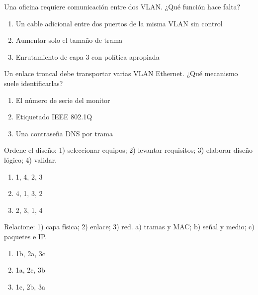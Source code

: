 \noindent\begin{minipage}{\linewidth}\setlength{\parskip}{4pt}\label{q:R-017}
Una oficina requiere comunicación entre dos VLAN. ¿Qué función hace falta?
\begin{enumerate}[label=\Alph*),nosep]
\item Un cable adicional entre dos puertos de la misma VLAN sin control
\item Aumentar solo el tamaño de trama
\item Enrutamiento de capa 3 con política apropiada
\end{enumerate}\end{minipage}\par\medskip

\noindent\begin{minipage}{\linewidth}\setlength{\parskip}{4pt}\label{q:R-018}
Un enlace troncal debe transportar varias VLAN Ethernet. ¿Qué mecanismo suele identificarlas?
\begin{enumerate}[label=\Alph*),nosep]
\item El número de serie del monitor
\item Etiquetado IEEE 802.1Q
\item Una contraseña DNS por trama
\end{enumerate}\end{minipage}\par\medskip

\noindent\begin{minipage}{\linewidth}\setlength{\parskip}{4pt}\label{q:R-019}
Ordene el diseño: 1) seleccionar equipos; 2) levantar requisitos; 3) elaborar diseño lógico; 4) validar.
\begin{enumerate}[label=\Alph*),nosep]
\item 1, 4, 2, 3
\item 4, 1, 3, 2
\item 2, 3, 1, 4
\end{enumerate}\end{minipage}\par\medskip

\noindent\begin{minipage}{\linewidth}\setlength{\parskip}{4pt}\label{q:R-020}
Relacione: 1) capa física; 2) enlace; 3) red. a) tramas y MAC; b) señal y medio; c) paquetes e IP.
\begin{enumerate}[label=\Alph*),nosep]
\item 1b, 2a, 3c
\item 1a, 2c, 3b
\item 1c, 2b, 3a
\end{enumerate}\end{minipage}\par\medskip

